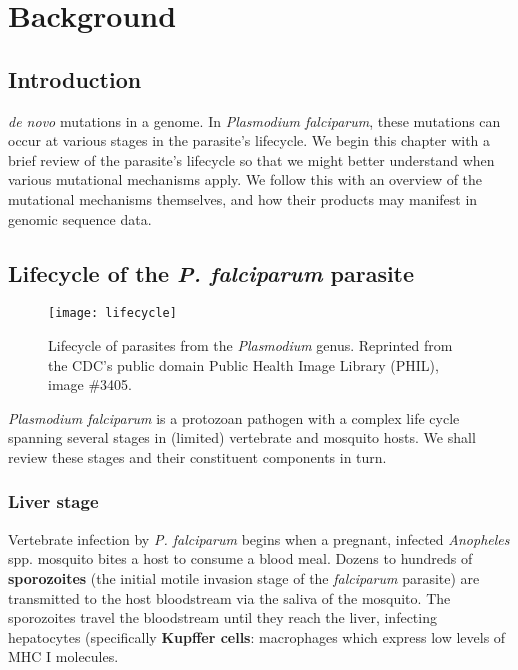 \chapter{Background}
\label{ch:background}

\section{Introduction}

 \textit{de novo} mutations in a genome.  In \textit{Plasmodium falciparum}, these mutations can occur at various stages in the parasite's lifecycle.  We begin this chapter with a brief review of the parasite's lifecycle so that we might better understand when various mutational mechanisms apply.  We follow this with an overview of the mutational mechanisms themselves, and how their products may manifest in genomic sequence data.

\section{Lifecycle of the \textit{P. falciparum} parasite}

\begin{figure}[h!]
  \centering
    \texttt{[image: lifecycle]}
  \caption{Lifecycle of parasites from the \textit{Plasmodium} genus.  Reprinted from the CDC's public domain Public Health Image Library (PHIL), image \#3405.}
  \label{fig:lifecycle}
\end{figure}

\textit{Plasmodium falciparum} is a protozoan pathogen with a complex life cycle spanning several stages in (limited) vertebrate and mosquito hosts.  We shall review these stages and their constituent components in turn.

\subsection{Liver stage}

Vertebrate infection by \textit{P. falciparum} begins when a pregnant, infected \textit{Anopheles} spp. mosquito bites a host to consume a blood meal\cite{Ross:1897kh}.  Dozens to hundreds of \textbf{sporozoites} (the initial motile invasion stage of the \textit{falciparum} parasite) are transmitted to the host bloodstream via the saliva of the mosquito\cite{Amino:2006gj}.  The sporozoites travel the bloodstream until they reach the liver, infecting hepatocytes (specifically \textbf{Kupffer cells}: macrophages which express low levels of MHC I molecules\cite{Torre:2002bi}.

